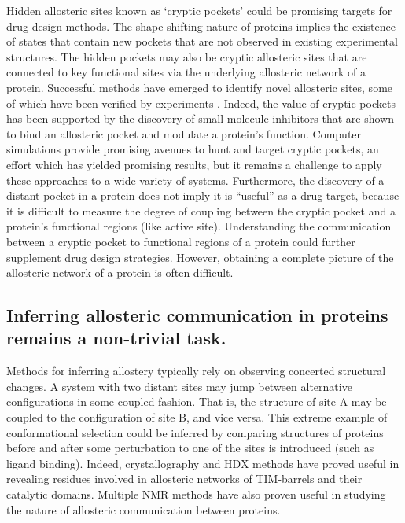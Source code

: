 \documentclass[../main.tex]{subfiles}
\begin{document}
		Hidden allosteric sites known as ‘cryptic pockets’ could be promising targets for drug design methods. The shape-shifting nature of proteins implies the existence of states that contain new pockets that are not observed in existing experimental structures. The hidden pockets may also be cryptic allosteric sites that are connected to key functional sites via the underlying allosteric network of a protein\cite{hardy_searching_2004}. Successful methods have emerged to identify novel allosteric sites, some of which have been verified by experiments \cite{Porter:2019hv}. Indeed, the value of cryptic pockets has been supported by the discovery of small molecule inhibitors that are shown to bind an allosteric pocket and modulate a protein’s function\cite{Hart:2016kb,Horn:2004uu,arkin_binding_2003,ostrem_k-rasg12c_2013}. Computer simulations provide promising avenues to hunt and target cryptic pockets, an effort which has yielded promising results\cite{Vajda:2018kt,schames_discovery_2004}, but it remains a challenge to apply these approaches to a wide variety of systems. Furthermore, the discovery of a distant pocket in a protein does not imply it is “useful” as a drug target, because it is difficult to measure the degree of coupling between the cryptic pocket and a protein’s functional regions (like active site). Understanding the communication between a cryptic pocket to functional regions of a protein could further supplement drug design strategies. However, obtaining a complete picture of the allosteric network of a protein is often difficult.

	\subsection{Inferring allosteric communication in proteins remains a non-trivial task.}
		Methods for inferring allostery typically rely on observing concerted structural changes. A system with two distant sites may jump between alternative configurations in some coupled fashion. That is, the structure of site A may be coupled to the configuration of site B, and vice versa. This extreme example of conformational selection could be inferred by comparing structures of proteins before and after some perturbation to one of the sites is introduced (such as ligand binding). Indeed, crystallography and HDX methods have proved useful in revealing residues involved in allosteric networks of TIM-barrels and their catalytic domains\cite{frantom_mapping_2009}. Multiple NMR methods have also proven useful in studying the nature of allosteric communication between proteins\cite{manley_nmr_2012}.
\end{document}

